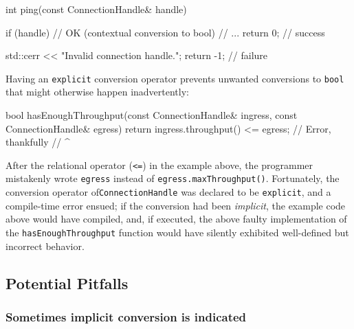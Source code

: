 \begin{emcppslisting}[emcppsbatch=e2]
int ping(const ConnectionHandle& handle)
{
    if (handle)  // OK (contextual conversion to bool)
    {
        // ...
        return 0;  // success
    }

    std::cerr << "Invalid connection handle.\n";
    return -1;  // failure
}
\end{emcppslisting}

\noindent Having an \lstinline!explicit! conversion operator prevents unwanted
conversions to \lstinline!bool! that might otherwise happen inadvertently:

\begin{emcppslisting}[emcppsbatch=e2]
bool hasEnoughThroughput(const ConnectionHandle& ingress,
                         const ConnectionHandle& egress)
{
    return ingress.throughput() <= egress;  // Error, thankfully
//                                    ^~~~~~
}
\end{emcppslisting}

\noindent After the relational operator (\lstinline!<=!) in the example above, the
programmer mistakenly wrote \lstinline!egress! instead of
\mbox{\lstinline!egress.maxThroughput()!}. Fortunately, the conversion operator of\linebreak[4] %
\mbox{\lstinline!ConnectionHandle!} was declared to be \lstinline!explicit!, and a
compile-time error ensued; if the conversion had
been \emph{implicit}, the example code above would have compiled, and,
if executed, the above faulty implementation of the \mbox{\lstinline!hasEnoughThroughput!}
function would have silently exhibited well-defined but incorrect
behavior.

\subsection[Potential Pitfalls]{Potential Pitfalls}\label{potential-pitfalls-explicitconv}

\subsubsection[Sometimes implicit conversion \emph{is} indicated]{Sometimes implicit conversion {\sfbsubsubsecitalRomeo is} indicated}\label{sometimes-implicit-conversion-is-indicated}

